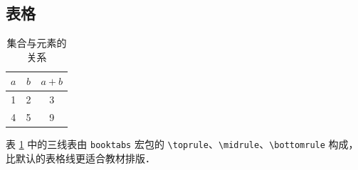 
\subsection{表格}

\begin{table}[H]
  \centering
  \caption{集合与元素的关系}
  \label{tab:demo}
  \begin{tabular}{ccc}
    \toprule
    $a$ & $b$ & $a+b$ \\
    \midrule
    1 & 2 & 3 \\
    4 & 5 & 9 \\
    \bottomrule
  \end{tabular}
\end{table}

表 \ref{tab:demo} 中的三线表由 \texttt{booktabs} 宏包的 \verb|\toprule|、\verb|\midrule|、\verb|\bottomrule| 构成，比默认的表格线更适合教材排版．
